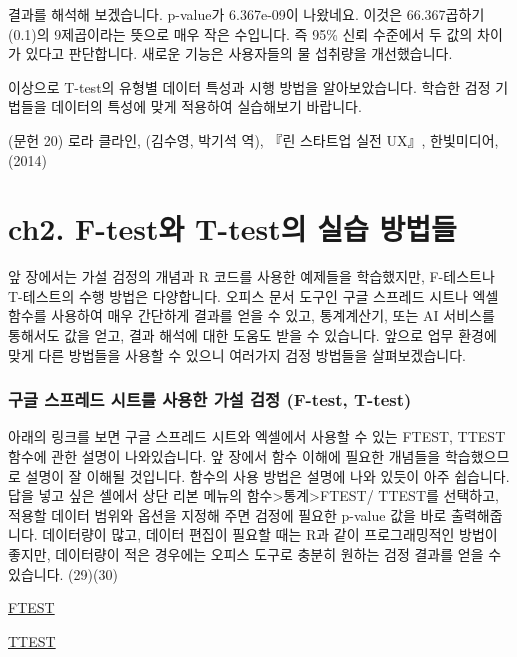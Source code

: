 \documentclass[
  letterpaper,
]{book}
\begin{document}
\begin{itemize}
  결과를 해석해 보겠습니다. p-value가 6.367e-09이 나왔네요. 이것은
  66.367곱하기 (0.1)의 9제곱이라는 뜻으로 매우 작은 수입니다. 즉 95\%
  신뢰 수준에서 두 값의 차이가 있다고 판단합니다. 새로운 기능은
  사용자들의 물 섭취량을 개선했습니다.

  이상으로 T-test의 유형별 데이터 특성과 시행 방법을 알아보았습니다.
  학습한 검정 기법들을 데이터의 특성에 맞게 적용하여 실습해보기
  바랍니다.
\end{itemize}

(문헌 20) 로라 클라인, (김수영, 박기석 역), 『린 스타트업 실전 UX』,
한빛미디어,(2014)

\chapter{ch2. F-test와 T-test의 실습
방법들}\label{ch2.-f-testuxc640-t-testuxc758-uxc2e4uxc2b5-uxbc29uxbc95uxb4e4}

앞 장에서는 가설 검정의 개념과 R 코드를 사용한 예제들을 학습했지만,
F-테스트나 T-테스트의 수행 방법은 다양합니다. 오피스 문서 도구인 구글
스프레드 시트나 엑셀 함수를 사용하여 매우 간단하게 결과를 얻을 수 있고,
통계계산기, 또는 AI 서비스를 통해서도 값을 얻고, 결과 해석에 대한 도움도
받을 수 있습니다. 앞으로 업무 환경에 맞게 다른 방법들을 사용할 수 있으니
여러가지 검정 방법들을 살펴보겠습니다.

\subsection{구글 스프레드 시트를 사용한 가설 검정 (F-test,
T-test)}\label{uxad6cuxae00-uxc2a4uxd504uxb808uxb4dc-uxc2dcuxd2b8uxb97c-uxc0acuxc6a9uxd55c-uxac00uxc124-uxac80uxc815-f-test-t-test}

아래의 링크를 보면 구글 스프레드 시트와 엑셀에서 사용할 수 있는 FTEST,
TTEST 함수에 관한 설명이 나와있습니다. 앞 장에서 함수 이해에 필요한
개념들을 학습했으므로 설명이 잘 이해될 것입니다. 함수의 사용 방법은
설명에 나와 있듯이 아주 쉽습니다. 답을 넣고 싶은 셀에서 상단 리본 메뉴의
함수\textgreater 통계\textgreater FTEST/ TTEST를 선택하고, 적용할 데이터
범위와 옵션을 지정해 주면 검정에 필요한 p-value 값을 바로 출력해줍니다.
데이터량이 많고, 데이터 편집이 필요할 때는 R과 같이 프로그래밍적인
방법이 좋지만, 데이터량이 적은 경우에는 오피스 도구로 충분히 원하는 검정
결과를 얻을 수 있습니다. (29)(30)

\href{https://support.google.com/docs/answer/7004183?hl=ko&ref_topic=3105600}{FTEST}

\href{https://support.google.com/docs/answer/6055837?hl=ko}{TTEST}
\end{document}
